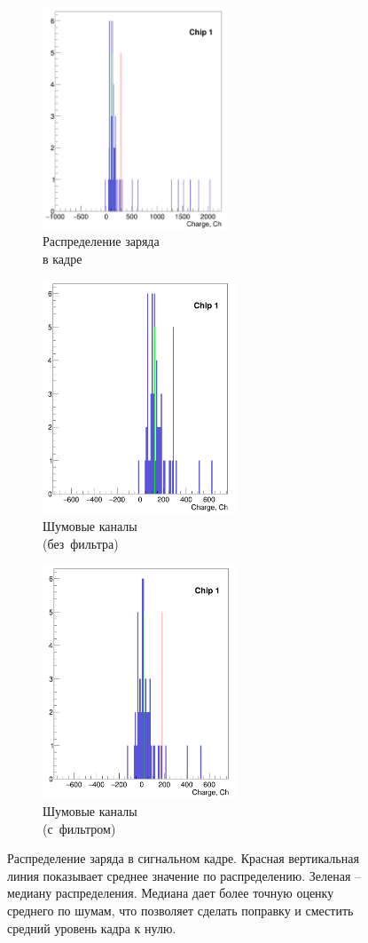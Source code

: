 \begin{figure}[H]
	\centering
	\begin{subfigure}{.33\textwidth}
		\centering
		\includegraphics[height = 6.5 cm, width= 5.5cm]{img/Median_unzoomed.png}
		\caption{Распределение заряда\\в кадре}
		\label{fig:median_signal}
	\end{subfigure}%
	\begin{subfigure}{.33\textwidth}
		\centering
		\includegraphics[height = 6.5 cm, width= 5.8cm]{img/Median_1.png}
		\caption{Шумовые каналы \\ (без~фильтра)}
		\label{fig:median_noize}
	\end{subfigure}
	\begin{subfigure}{.33\textwidth}
		\centering
		\includegraphics[height = 6.5 cm, width= 5.8cm]{img/Median_0.png}
		\caption{Шумовые каналы\\(с~фильтром)}
		\label{fig:medianF_noize_biased}
	\end{subfigure}%
	\caption{Распределение заряда в сигнальном кадре. Красная вертикальная линия показывает среднее значение по распределению. Зеленая -- медиану распределения. Медиана дает более точную оценку среднего по шумам, что позволяет сделать поправку и сместить средний уровень кадра к нулю.}
	\label{fig:medianF}
\end{figure}

